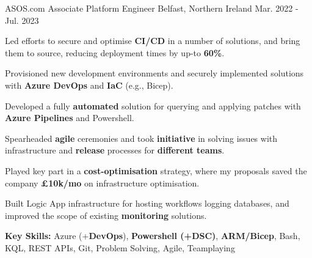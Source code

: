 \begin{cventries}
  \cventry
  	{ASOS.com} %
    {Associate Platform Engineer} %
    {Belfast, Northern Ireland} %
    {Mar. 2022 - Jul. 2023} %
    {
      \begin{cvitems} %
        \item {Led efforts to secure and optimise \textbf{CI/CD} in a number of solutions, and bring them to source, reducing deployment times by up-to \textbf{60\%}.}
        \item {Provisioned new development environments and securely implemented solutions with \textbf{Azure DevOps} and \textbf{IaC} (e.g., Bicep).}
        \item {Developed a fully \textbf{automated} solution for querying and applying patches with \textbf{Azure Pipelines} and Powershell.}
        \item {Spearheaded \textbf{agile} ceremonies and took \textbf{initiative} in solving issues with infrastructure and \textbf{release} processes for \textbf{different teams}.}
        \item {Played key part in a \textbf{cost-optimisation} strategy, where my proposals saved the company \textbf{\approx £10k/mo} on infrastructure optimisation.}
		\item {Built Logic App infrastructure for hosting workflows logging databases, and improved the scope of existing \textbf{monitoring} solutions.}
        \item {\textbf{Key Skills:} Azure (+\textbf{DevOps}), \textbf{Powershell (+DSC)}, \textbf{ARM/Bicep}, Bash, KQL, REST APIs, Git, Problem Solving, Agile, Teamplaying}
      \end{cvitems}
    }


\end{cventries}
